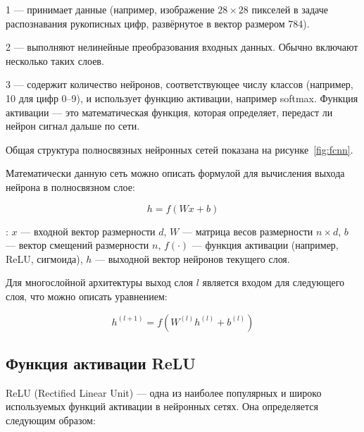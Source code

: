     1  — принимает данные (например, изображение 
    $28\times28$ пикселей в задаче распознавания рукописных цифр, развёрнутое в
    вектор размером 784).

    2  — выполняют нелинейные преобразования входных данных. 
    Обычно включают несколько таких слоев.

    3  — содержит количество нейронов, соответствующее 
    числу классов (например, 10 для цифр 0–9), и использует функцию активации, 
    например softmax. Функция активации — это математическая функция, которая 
    определяет, передаст ли нейрон сигнал дальше по сети.

Общая структура полносвязных нейронных сетей показана на 
рисунке~\ref{fig:fcnn}.


Математически данную сеть можно описать формулой для вычисления выхода нейрона 
в полносвязном слое:

\begin{equation}
    {h} = f({W} {x} + {b})
\end{equation}

: ${x}$ — входной вектор размерности $d$,
              ${W}$ — матрица весов размерности $n \times d$,
              ${b}$ — вектор смещений размерности $n$,
              $f(\cdot)$ — функция активации (например, ReLU, сигмоида),
              ${h}$ — выходной вектор нейронов текущего слоя.

Для многослойной архитектуры выход слоя $l$ является входом для следующего слоя, 
что можно описать уравнением:

\begin{equation}
    {h}^{(l+1)} = f({W}^{(l)} {h}^{(l)} + {b}^{(l)})
\end{equation}

\subsection{Функция активации ReLU}
\hspace*{12.5 mm}ReLU (Rectified Linear Unit) — одна из наиболее популярных и 
широко используемых функций активации в нейронных сетях. Она определяется 
следующим образом:

